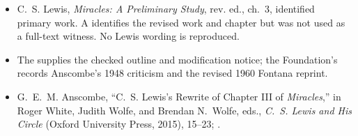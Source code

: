 {\fontsize{8.6}{9.6}\selectfont
\begin{itemize}[itemsep=0pt,parsep=0pt,topsep=0.05em]
\item C.~S. Lewis, \emph{Miracles: A Preliminary Study}, rev. ed., ch.~3, identified primary work. A  identifies the revised work and chapter but was not used as a full-text witness. No Lewis wording is reproduced.
\item The  supplies the checked outline and modification notice; the Foundation's  records Anscombe's 1948 criticism and the revised 1960 Fontana reprint.
\item G.~E.~M. Anscombe, ``C.~S. Lewis's Rewrite of Chapter III of \emph{Miracles},'' in Roger White, Judith Wolfe, and Brendan N.~Wolfe, eds., \emph{C.~S. Lewis and His Circle} (Oxford University Press, 2015), 15--23; .
\end{itemize}}

\endgroup
